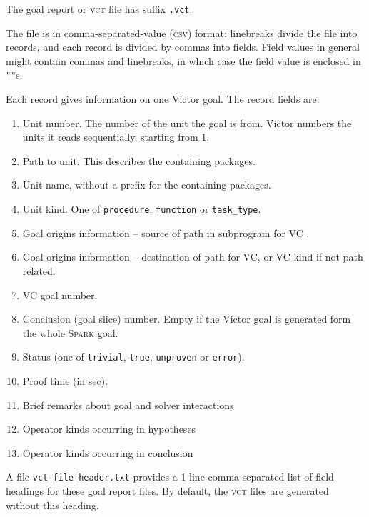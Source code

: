 \documentclass[12pt,fleqn]{article}
\newcommand{\spark}{\textsc{Spark}}
\newcommand{\goalreportfile}{\textsc{vct}}
\newcommand{\csv}{\textsc{csv}}
\begin{document}
The goal report or \goalreportfile{} file has suffix \texttt{.vct}.  

The file is in comma-separated-value (\csv) format: linebreaks divide the file
into records, and each record is divided by commas into fields.  Field values in
general might contain commas and linebreaks, in which case the field value is
enclosed in \texttt{""}s.

Each record gives information on one Victor goal.
The record fields are:
\begin{enumerate}
\item Unit number.  The number of the unit the goal is from.  Victor numbers
   the units it reads sequentially, starting from 1.
\item Path to unit. This describes the containing packages.
\item Unit name, without a prefix for the containing packages.
\item Unit kind.  One of \texttt{procedure}, 
  \texttt{function} or \texttt{task\_type}.
\item Goal origins information -- source of path in subprogram for VC .
\item Goal origins information -- destination of path for VC, or VC
  kind if not path related.
\item VC goal number.
\item Conclusion (goal slice) number.  Empty if the Victor goal is generated
   form the whole \spark{} goal.
 \item Status (one of \texttt{trivial}, \texttt{true}, \texttt{unproven} or
   \texttt{error}).
\item Proof time (in sec).
\item Brief remarks about goal and solver interactions
\item Operator kinds occurring in hypotheses
\item Operator kinds occurring in conclusion
\end{enumerate}
A file \texttt{vct-file-header.txt} provides a 1 line comma-separated
list of field headings for these goal report files.  By default, the
\goalreportfile{} files are generated without this heading.



\end{document}
